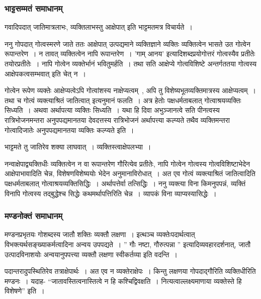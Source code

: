 			\subsubsection{भाट्टसम्मतं समाधानम्}
				
				गवादिपदात् जातिमात्रलाभः, व्यक्तिलाभस्तु आक्षेपात् इति भाट्टमतमत्र विचार्यते~। 
				
				ननु गोपदात् गोत्वस्मरणे जाते ततः आक्षेपात् उत्पद्यमाने व्यक्तिज्ञाने व्यक्तिः व्यक्तित्वेन भासते उत गोत्वेन रूपान्तरेण~। न तावत् व्यक्तित्वेन नापि रूपान्तरेण~। 'गाम् आनय' इत्यादिशब्दप्रयोगोत्तरं गोत्वस्यैव प्रतीतेः तयोरप्रतीतेः~। नापि गोत्वेन व्यक्तेर्भानं भवितुमर्हति~। तथा सति आक्षेप्ये गोत्वविशिष्टे अन्तर्गततया गोत्वस्य आक्षेपकत्वसम्भवात् इति चेत् न~। 
				
				गोत्वेन रूपेण व्यक्तेः आक्षेप्यत्वेऽपि गोत्वांशस्य नाक्षेप्यत्वम्~, अपि तु विशेष्यभूतव्यक्तिमात्रस्य आक्षेप्यत्वम्~। तथा च गोत्वं व्यक्त्याश्रितं जातित्वात् इत्यनुमानं फलति~। अत्र हेतोः पक्षधर्मताबलात् गोत्वाश्रयव्यक्तिः सिध्यति~। अथवा अर्थापत्या व्यक्तिः सिध्यति~। यथा हि दिवा अभुञ्जानत्वे सति पीनत्वस्य रात्रिभोजनमन्तरा अनुपपद्यमानतया देवदत्तस्य रात्रिभोजनं अर्थापत्त्या कल्प्यते तथैव व्यक्तिमन्तरा गोत्वादिजातेः अनुपपद्यमानतया व्यक्तिः कल्प्यते इति~। 

				\begin{small}

					भाट्टमते तु जातिरेव शक्या लाघवात्~। व्यक्तिस्त्वाक्षेपलभ्या~।
	
					नन्वाक्षेपाद्व्यक्तिधीः व्यक्तित्वेन न वा रूपान्तरेण गौरित्येव प्रतीतेः, नापि गोत्वेन गोत्वस्य गोत्वविशिष्टाभेदेन आक्षेपाभावादिति चेन्न, विशेषणविशेष्ययोः भेदेन अनुमानाविरोधात्~।  अत एव गोत्वं व्यक्त्याश्रितं जातित्वादिति पक्षधर्मताबलात् गोत्वाश्रयव्यक्तिसिद्धिः~। अर्थापत्तेर्वा तत्सिद्धिः~। ननु व्यक्त्या विना किमनुपपन्नं, व्यक्तिं विनापि गोत्वस्य तद्बुद्धेश्च सिद्धेः कथमर्थापत्तिरिति चेन्न~। व्यापकं विना व्याप्यस्यासिद्धेः~।
				\end{small}

			\subsubsection{मण्डनोक्तं समाधानम्} 

				मण्डनप्रभृतयः गोशब्दस्य जातौ शक्तिः व्यक्तौ लक्षणा~। इत्थञ्च व्यक्तेःपदार्थत्वात् विभक्त्यर्थसङ्ख्याकर्मत्वादिना अन्वय उपपद्यते~। ” गौः नष्टा, गौरुत्पन्ना ” इत्यादिव्यवहारदर्शनात्, जातौ उत्पादविनाशयोः अन्वयानुपपत्त्या व्यक्तौ लक्षणा स्वीकर्तव्या इति वदन्ति~। 

				\begin{small}

					पदान्तरादुपस्थितिरेव तत्राक्षेपार्थः~। अत एव न व्यक्तेराक्षेपः~। किन्तु लक्षणया गोपदाद्गौरिति व्यक्तिधीरिति मण्डनः~। यदाह- “जातावस्तित्वनास्तित्वे न हि कश्चिद्विवक्षति~। नित्यत्वाल्लक्ष्यमाणाया व्यक्तेस्ते हि विशेषणे” इति~। 
	
				\end{small}

